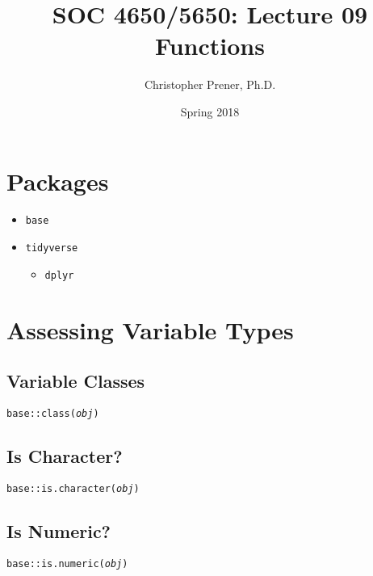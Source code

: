 \documentclass{tufte-handout}
\title{SOC 4650/5650: Lecture 09 Functions}
\author{Christopher Prener, Ph.D.}
\date{Spring 2018}
\newenvironment{subs}
  {\adjustwidth{1em}{0pt}}
  {\endadjustwidth}
\begin{document}
\maketitle %

\vspace{5mm}
\section{Packages}
\begin{itemize}
\item \texttt{base}
\item \texttt{tidyverse}
\begin{itemize}
\item \texttt{dplyr}
\end{itemize}
\end{itemize}

\vspace{5mm}
\section{Assessing Variable Types}
\begin{subs}
\subsection{Variable Classes}
\texttt{base::}{\color{red}\texttt{class}}\texttt{(\textit{obj})}

\vspace{3mm}
\subsection{Is Character?}
\texttt{base::}{\color{red}\texttt{is.character}}\texttt{(\textit{obj})}

\vspace{3mm}
\subsection{Is Numeric?}
\texttt{base::}{\color{red}\texttt{is.numeric}}\texttt{(\textit{obj})}
\end{subs}

\vspace{5mm}
\end{document}
